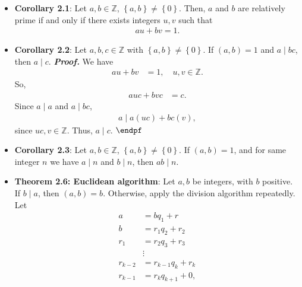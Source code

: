 \documentclass{report}
\begin{document}
\begin{itemize}
\begin{align*}
            .\end{align*}
            Hence, $r \in S$ if $r > 0$. But, $r < g$, contradicting the minimality of $g$. So, $r = 0$, and $g\mid a$. Using the same argument, we can also get that $g\mid b$. $\endpf$
        \item \textbf{Corollary 2.1}: Let $a,b \in \mathbb{Z}$, $\left\{a,b\right\} \ne \left\{0\right\}$. Then, $a$ and $b$ are relatively prime if and only if there exists integers $u,v$ such that
            \begin{align*}
                au + bv = 1
            .\end{align*}
        \item \textbf{Corollary 2.2}: Let $a,b,c  \in \mathbb{Z}$ with $\left\{a,b\right\} \ne \left\{0\right\}$. If $(a,b) =1$ and $a \mid bc$, then $a \mid c$.
            \bigbreak \noindent 
            \textbf{\textit{Proof.}} We have
            \begin{align*}
                au + bv &= 1, \quad u,v \in \mathbb{Z}
            .\end{align*}
            So,
            \begin{align*}
                auc + bvc &= c
            .\end{align*}
            Since $a \mid a$ and $a \mid bc$, 
            \begin{align*}
                a \mid a(uc) + bc(v)
            ,\end{align*}
            since $uc, v \in \mathbb{Z}$. Thus, $a \mid c$. $\endpf $
        \item \textbf{Corollary 2.3}: Let $a,b \in \mathbb{Z}$, $\left\{a,b\right\} \ne \left\{0\right\}$. If $(a,b) = 1$, and for same integer $n$ we have $a \mid n$ and $b \mid n$, then $ab \mid n$.
        \item \textbf{Theorem 2.6: Euclidean algorithm}: Let $a,b$ be integers, with $b$ positive. If $b \mid a$, then $(a,b) = b$. Otherwise, apply the division algorithm repeatedly. Let
            \begin{align*}
                a &= bq_{1} + r \\
                b &= r_{1}q_{2} + r_{2} \\
                r_{1} &= r_{2}q_{3} + r_{3} \\
                      &\vdots \\
                r_{k-2} &= r_{k-1}q_{k} + r_{k} \\
                r_{k-1} &= r_{k}q_{k+1} + 0
            ,\end{align*}

\end{itemize}
\end{document}
